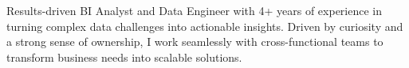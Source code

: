 \begin{justify}
Results-driven BI Analyst and Data Engineer with 4+ years of experience in turning complex data challenges into actionable insights. Driven by curiosity and a strong sense of ownership, I work seamlessly with cross-functional teams to transform business needs into scalable solutions.
\end{justify}
\vspace{-15pt}